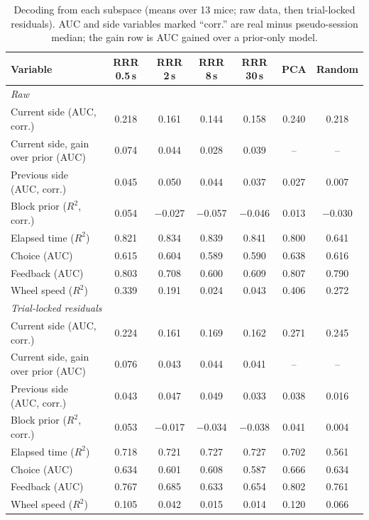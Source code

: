 \documentclass{article}
\begin{document}
\begin{table}[H]
  \caption{Decoding from each subspace (means over 13 mice; raw data, then trial-locked residuals). AUC and side
  variables marked ``corr.'' are real minus pseudo-session median; the gain row is AUC gained over a prior-only model.}
  \label{tab:content}
  \centering\footnotesize
  \begin{tabular}{lcccccc}
    \toprule
    Variable & RRR 0.5\,s & RRR 2\,s & RRR 8\,s & RRR 30\,s & PCA & Random \\
    \midrule
    \multicolumn{7}{l}{\emph{Raw}} \\
    Current side (AUC, corr.) & 0.218 & 0.161 & 0.144 & 0.158 & 0.240 & 0.218 \\
    Current side, gain over prior (AUC) & 0.074 & 0.044 & 0.028 & 0.039 & -- & -- \\
    Previous side (AUC, corr.) & 0.045 & 0.050 & 0.044 & 0.037 & 0.027 & 0.007 \\
    Block prior ($R^2$, corr.) & 0.054 & $-$0.027 & $-$0.057 & $-$0.046 & 0.013 & $-$0.030 \\
    Elapsed time ($R^2$) & 0.821 & 0.834 & 0.839 & 0.841 & 0.800 & 0.641 \\
    Choice (AUC) & 0.615 & 0.604 & 0.589 & 0.590 & 0.638 & 0.616 \\
    Feedback (AUC) & 0.803 & 0.708 & 0.600 & 0.609 & 0.807 & 0.790 \\
    Wheel speed ($R^2$) & 0.339 & 0.191 & 0.024 & 0.043 & 0.406 & 0.272 \\
    \midrule
    \multicolumn{7}{l}{\emph{Trial-locked residuals}} \\
    Current side (AUC, corr.) & 0.224 & 0.161 & 0.169 & 0.162 & 0.271 & 0.245 \\
    Current side, gain over prior (AUC) & 0.076 & 0.043 & 0.044 & 0.041 & -- & -- \\
    Previous side (AUC, corr.) & 0.043 & 0.047 & 0.049 & 0.033 & 0.038 & 0.016 \\
    Block prior ($R^2$, corr.) & 0.053 & $-$0.017 & $-$0.034 & $-$0.038 & 0.041 & 0.004 \\
    Elapsed time ($R^2$) & 0.718 & 0.721 & 0.727 & 0.727 & 0.702 & 0.561 \\
    Choice (AUC) & 0.634 & 0.601 & 0.608 & 0.587 & 0.666 & 0.634 \\
    Feedback (AUC) & 0.767 & 0.685 & 0.633 & 0.654 & 0.802 & 0.761 \\
    Wheel speed ($R^2$) & 0.105 & 0.042 & 0.015 & 0.014 & 0.120 & 0.066 \\
    \bottomrule
  \end{tabular}
\end{table}
\end{document}
